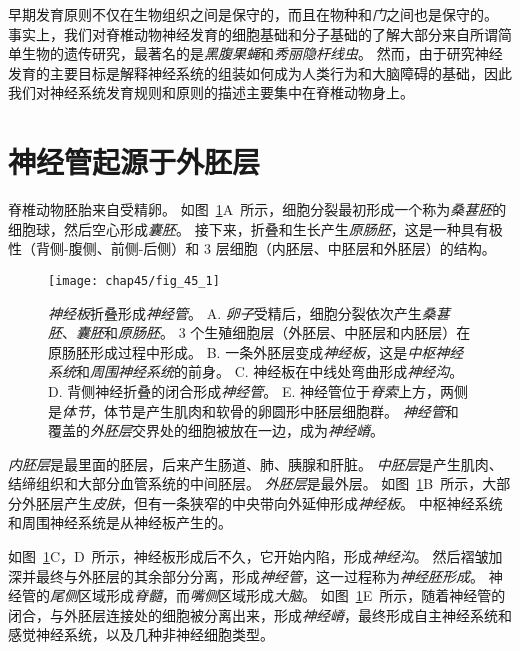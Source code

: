 早期发育原则不仅在生物组织之间是保守的，而且在物种和\textit{门}之间也是保守的。
事实上，我们对脊椎动物神经发育的细胞基础和分子基础的了解大部分来自所谓简单生物的遗传研究，最著名的是\textit{黑腹果蝇}和\textit{秀丽隐杆线虫}。
然而，由于研究神经发育的主要目标是解释神经系统的组装如何成为人类行为和大脑障碍的基础，因此我们对神经系统发育规则和原则的描述主要集中在脊椎动物身上。



\section{神经管起源于外胚层}

脊椎动物胚胎来自受精卵。
如图~\ref{fig:45_1}A~所示，细胞分裂最初形成一个称为\textit{桑葚胚}的细胞球，然后空心形成\textit{囊胚}。
接下来，折叠和生长产生\textit{原肠胚}，这是一种具有极性（背侧-腹侧、前侧-后侧）和 3 层细胞（内胚层、中胚层和外胚层）的结构。


\begin{figure}[htbp]
	\centering
	\texttt{[image: chap45/fig\_45\_1]}
	\caption{\textit{神经板}折叠形成\textit{神经管}。
		A. \textit{卵子}受精后，细胞分裂依次产生\textit{桑葚胚}、\textit{囊胚}和\textit{原肠胚}。
		3 个生殖细胞层（外胚层、中胚层和内胚层）在原肠胚形成过程中形成。
		B. 一条外胚层变成\textit{神经板}，这是\textit{中枢神经系统}和\textit{周围神经系统}的前身。
		C. 神经板在中线处弯曲形成\textit{神经沟}。
		D. 背侧神经折叠的闭合形成\textit{神经管}。
		E. 神经管位于\textit{脊索}上方，两侧是\textit{体节}，体节是产生肌肉和软骨的卵圆形中胚层细胞群。
		\textit{神经管}和覆盖的\textit{外胚层}交界处的细胞被放在一边，成为\textit{神经嵴}。}
	\label{fig:45_1}
\end{figure}


\textit{内胚层}是最里面的胚层，后来产生肠道、肺、胰腺和肝脏。
\textit{中胚层}是产生肌肉、结缔组织和大部分血管系统的中间胚层。
\textit{外胚层}是最外层。
如图~\ref{fig:45_1}B~所示，大部分外胚层产生\textit{皮肤}，但有一条狭窄的中央带向外延伸形成\textit{神经板}。
中枢神经系统和周围神经系统是从神经板产生的。


如图~\ref{fig:45_1}C，D~所示，神经板形成后不久，它开始内陷，形成\textit{神经沟}。
然后褶皱加深并最终与外胚层的其余部分分离，形成\textit{神经管}，这一过程称为\textit{神经胚形成}。
神经管的\textit{尾侧}区域形成\textit{脊髓}，而\textit{嘴侧}区域形成\textit{大脑}。
如图~\ref{fig:45_1}E~所示，随着神经管的闭合，与外胚层连接处的细胞被分离出来，形成\textit{神经嵴}，最终形成自主神经系统和感觉神经系统，以及几种非神经细胞类型。



